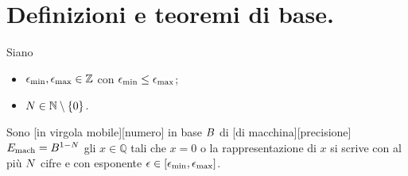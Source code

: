 \section{Definizioni e teoremi di base.}
\label{AritmeticaInVirgolaMobile_DefinizioniETeoremiDiBase}
\begin{Definition}
	\label{AritmeticaInVirgolaMobile_DefinizioneNumeriInVirgolaMobile}
	Siano
	\begin{itemize}
		\item $\epsilon_{\min},\epsilon_{\max} \in \mathbb{Z}$ con $\epsilon_{\min} \leq \epsilon_{\max}$;
		\item $N \in \mathbb{N} \setminus \lbrace 0 \rbrace$.
	\end{itemize}
	Sono [in virgola mobile][numero] in base $B$ di [di macchina][precisione] $E_{\text{mach}} = B^{1 - N}$ gli $x \in \mathbb{Q}$ tali che $x = 0$ o la rappresentazione di $x$ si scrive con al pi\`u $N$ cifre e con esponente $\epsilon \in [\epsilon_{\min},\epsilon_{\max}]$.
\end{Definition}
